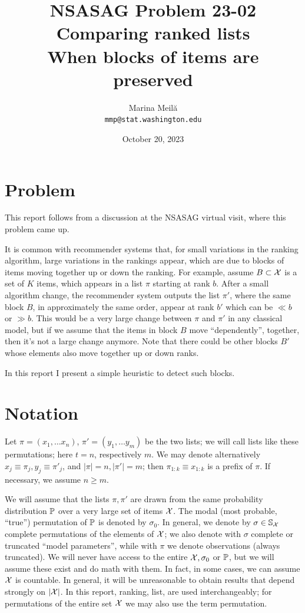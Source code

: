 \documentclass[10pt]{article}
\title{NSASAG Problem 23-02 Comparing ranked lists\\When blocks of items are preserved}
\author{Marina Meil\u{a}\\{\tt mmp@stat.washington.edu}}
\date{October 20, 2023}
\begin{document}
\maketitle

\section{Problem}
\label{sec:problem}
This report follows from a discussion at the NSASAG virtual visit, where this problem came up.

It is common with recommender systems that, for small variations in the ranking algorithm, large variations in the rankings appear, which are due to blocks of items moving together up or down the ranking. For example, assume $B\subset {\mathcal X}$ is a set of $K$ items, which appears in a list  $\pi$ starting at rank $b$. After a small algorithm change, the recommender system outputs the list $\pi'$, where the same block $B$, in approximately the same order, appear at rank $b'$ which can be $\ll b$ or $\gg b$. This would be a very large change between $\pi$ and $\pi'$ in any classical model, but if we assume that the items in block $B$ move ``dependently'', together, then it's not a large change anymore. Note that there could be other blocks $B'$ whose elements also move together up or down ranks. 

In this report I present a simple heuristic to detect such blocks. 


\section{Notation}
\label{sec:notation}

Let $\pi=(x_1,\ldots x_n)$, $\pi'=(y_1,\ldots y_m)$ be the two lists; we will call lists like these \topt permutations; here $t=n$, respectively $m$. We may denote alternatively $x_j\equiv \pi_j, y_j\equiv \pi'_j$, and $|\pi|=n,|\pi'|=m$; then $\pi_{1:k}\equiv x_{1:k}$ is a prefix of $\pi$. If necessary, we assume $n\geq m$. 

We will assume that the lists $\pi,\pi'$ are drawn from the same probability
distribution ${\mathbb P}$ over a very large set of items ${\mathcal X}$. The modal
 (most probable, ``true'') permutation of ${\mathbb P}$ is
denoted by $\sigma_0$. In general, we denote by $\sigma\in {\mathbb S}_{{\mathcal X}}$
complete permutations of the elements of ${\mathcal X}$; we also denote with $\sigma$ complete or truncated ``model parameters'', while with $\pi$ we denote observations (always truncated). We will never have access to the entire ${\mathcal X},\sigma_0$ or ${\mathbb P}$, but we will assume these exist and do math with them. In fact, in some cases, we can assume ${\mathcal X}$ is countable. In general, it will be unreasonable to obtain results that depend strongly on $|{\mathcal X}|$.  In this report, ranking, list, are used interchangeably; for permutations of the entire set ${\mathcal X}$ we may also use the term permutation.
\end{document}
